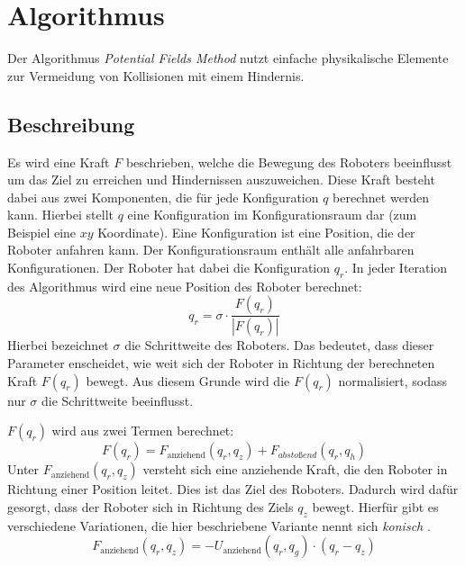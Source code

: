\section{Algorithmus}\label{sec:algo}

Der Algorithmus \textit{Potential Fields Method} nutzt einfache physikalische Elemente zur Vermeidung von Kollisionen mit einem Hindernis.

\subsection{Beschreibung}
Es wird eine Kraft $F$ beschrieben, welche die Bewegung des Roboters beeinflusst um das Ziel zu erreichen und Hindernissen auszuweichen.
Diese Kraft besteht dabei aus zwei Komponenten, die für jede Konfiguration $q$ berechnet werden kann.
Hierbei stellt $q$ eine Konfiguration im Konfigurationsraum dar (zum Beispiel eine $xy$ Koordinate).
Eine Konfiguration ist eine Position, die der Roboter anfahren kann.
Der Konfigurationsraum enthält alle anfahrbaren Konfigurationen.
Der Roboter hat dabei die Konfiguration $q_r$.
In jeder Iteration des Algorithmus wird eine neue Position des Roboter berechnet:
\begin{equation}
	q_r = \sigma \cdot \frac{F(q_r)}{|F(q_r)|}
\end{equation}
Hierbei bezeichnet $\sigma$ die Schrittweite des Roboters. Das bedeutet, dass dieser Parameter enscheidet, wie weit sich der Roboter in Richtung der berechneten Kraft $F(q_r)$ bewegt. Aus diesem Grunde wird die $F(q_r)$ normalisiert, sodass nur $\sigma$ die Schrittweite beeinflusst.

$F(q_r)$ wird aus zwei Termen berechnet:
\begin{equation} \label{eq:grad_field}
     F(q_r) = F_{\text{anziehend}}(q_r, q_z) + F_{abstoßend}(q_r,q_h)
\end{equation}
Unter $F_{\text{anziehend}}(q_r, q_z)$ versteht sich eine anziehende Kraft, die den Roboter in  Richtung einer Position leitet.
Dies ist das Ziel des Roboters.
Dadurch wird dafür gesorgt, dass der Roboter sich in Richtung des Ziels $q_z$ bewegt.
Hierfür gibt es verschiedene Variationen, die hier beschriebene Variante nennt sich \textit{konisch} \cite{Formulars}.
\begin{equation}\label{eq:grad_attr}
	F_{\text{anziehend}}(q_r, q_z)= -U_{\text{anziehend}}(q_r, q_g) \cdot (q_r - q_z)
\end{equation}

